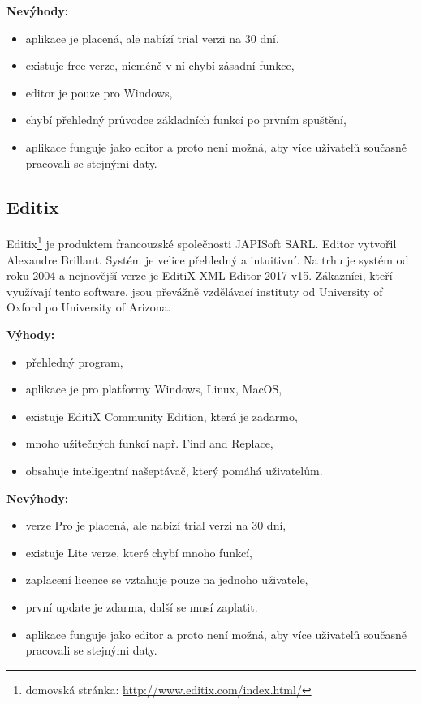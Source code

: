             \textbf{Nevýhody:}
                \begin{itemize}
                    \item aplikace je placená, ale nabízí trial verzi na 30 dní,
                    \item existuje free verze, nicméně v ní chybí zásadní funkce,
                    \item editor je pouze pro Windows,
                    \item chybí přehledný průvodce základních funkcí po prvním spuštění,
                    \item aplikace funguje jako editor a proto není možná, aby více uživatelů současně pracovali se stejnými daty.                \end{itemize}
                
        \subsection{Editix} 
            Editix\footnote{domovská stránka: \url{http://www.editix.com/index.html/}} je produktem francouzské společnosti JAPISoft SARL. Editor vytvořil Alexandre Brillant. Systém je velice přehledný a intuitivní. Na trhu je systém od roku 2004 a nejnovější verze je EditiX XML Editor 2017 v15. Zákazníci, kteří využívají tento software, jsou převážně vzdělávací instituty od University of Oxford po University of Arizona.
            
            \textbf{Výhody:}
                \begin{itemize}
                    \item přehledný program,
                    \item aplikace je pro platformy Windows, Linux, MacOS,
                    \item existuje EditiX Community Edition, která je zadarmo,
                    \item mnoho užitečných funkcí např. Find and Replace,
                    \item obsahuje inteligentní našeptávač, který pomáhá uživatelům.
                \end{itemize}
                
            \textbf{Nevýhody:}
                \begin{itemize}
                    \item verze Pro je placená, ale nabízí trial verzi na 30 dní,
                    \item existuje Lite verze, které chybí mnoho funkcí,
                    \item zaplacení licence se vztahuje pouze na jednoho uživatele,
                    \item první update je zdarma, další se musí zaplatit.
                    \item aplikace funguje jako editor a proto není možná, aby více uživatelů současně pracovali se stejnými daty.   
                \end{itemize}
                
